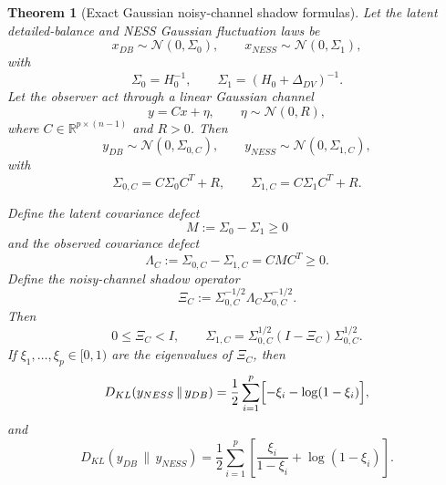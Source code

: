 \documentclass[11pt,a4paper]{article}
\numberwithin{equation}{section}
\theoremstyle{thmcompact}
\newtheorem{theorem}{Theorem}[section]
\theoremstyle{remark}
\begin{document}
\begin{theorem}[Exact Gaussian noisy-channel shadow formulas]
\label{thm:noisy_channel_shadow}
Let the latent detailed-balance and NESS Gaussian fluctuation laws be
\begin{equation}
x_{DB}\sim \mathcal N(0,\Sigma_0),
\qquad
x_{NESS}\sim \mathcal N(0,\Sigma_1),
\end{equation}
with
\begin{equation}
\Sigma_0=H_0^{-1},
\qquad
\Sigma_1=(H_0+\Delta_{DV})^{-1}.
\end{equation}
Let the observer act through a linear Gaussian channel
\begin{equation}
y=Cx+\eta,
\qquad
\eta\sim \mathcal N(0,R),
\end{equation}
where \(C\in\mathbb R^{p\times (n-1)}\) and \(R>0\). Then
\begin{equation}
y_{DB}\sim \mathcal N(0,\Sigma_{0,C}),
\qquad
y_{NESS}\sim \mathcal N(0,\Sigma_{1,C}),
\end{equation}
with
\begin{equation}
\Sigma_{0,C}=C\Sigma_0 C^T+R,
\qquad
\Sigma_{1,C}=C\Sigma_1 C^T+R.
\end{equation}

Define the latent covariance defect
\begin{equation}
M:=\Sigma_0-\Sigma_1\ge 0
\end{equation}
and the observed covariance defect
\begin{equation}
\Lambda_C:=\Sigma_{0,C}-\Sigma_{1,C}=CMC^T\ge 0.
\end{equation}
Define the noisy-channel shadow operator
\begin{equation}
\Xi_C:=\Sigma_{0,C}^{-1/2}\Lambda_C\Sigma_{0,C}^{-1/2}.
\end{equation}
Then
\begin{equation}
0\le \Xi_C<I,
\qquad
\Sigma_{1,C}=\Sigma_{0,C}^{1/2}(I-\Xi_C)\Sigma_{0,C}^{1/2}.
\end{equation}
If \(\xi_1,\dots,\xi_p\in[0,1)\) are the eigenvalues of \(\Xi_C\), then
\begin{equation}
D_{KL}(y_{NESS}\,\|\,y_{DB})
=
\frac12\sum_{i=1}^{p}\Bigl[-\xi_i-\log(1-\xi_i)\Bigr],
\end{equation}
and
\begin{equation}
D_{KL}(y_{DB}\,\|\,y_{NESS})
=
\frac12\sum_{i=1}^{p}\left[\frac{\xi_i}{1-\xi_i}+\log(1-\xi_i)\right].
\end{equation}
\end{theorem}
\end{document}

